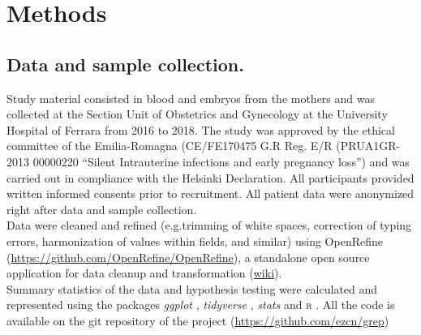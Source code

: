 
\chapter{Methods} %

\label{Chapter5} %


\newcommand{\keyword}[1]{\textbf{#1}}
\newcommand{\tabhead}[1]{\textbf{#1}}
\newcommand{\code}[1]{\texttt{#1}}
\newcommand{\file}[1]{\texttt{\bfseries#1}}
\newcommand{\option}[1]{\texttt{\itshape#1}}







\section{Data and sample collection.} Study material consisted in blood and embryos from the mothers and was collected at the Section Unit of Obstetrics and Gynecology at the University Hospital of Ferrara from 2016 to 2018. The study was approved by the ethical committee of the Emilia-Romagna (CE/FE170475 G.R Reg. E/R (PRUA1GR-2013 00000220 “Silent Intrauterine infections and early pregnancy loss”) and was carried out in compliance with the Helsinki Declaration. All participants provided written informed consents prior to recruitment. All patient data were anonymized right after data and sample collection.\\ 

Data were cleaned and refined (e.g.trimming of white spaces, correction of typing errors, harmonization of values within fields, and similar) using OpenRefine (\url{https://github.com/OpenRefine/OpenRefine}), a standalone open source application for data cleanup and transformation (\href{https://en.wikipedia.org/wiki/OpenRefine}{wiki}).\\

Summary statistics of the data and hypothesis testing were calculated and represented using the packages \textit{ggplot} \cite{ggplot2}, \textit{tidyverse} \cite{wickham2019welcome}, \textit{stats} \cite{statsR} and \textsc{r} \cite{R}. All the code is available on the git repository of the project (\url{https://github.com/ezcn/grep}) 

